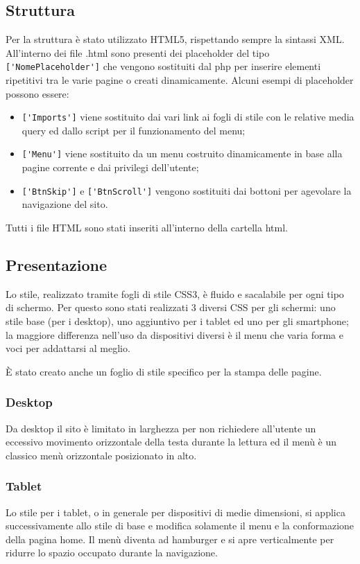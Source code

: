 \subsection{Struttura}
    Per la struttura è stato utilizzato HTML5, rispettando sempre la sintassi XML.
    All'interno dei file .html sono presenti dei placeholder del tipo \verb|['NomePlaceholder']| che vengono sostituiti dal php per inserire elementi ripetitivi tra le varie pagine o creati dinamicamente.
    Alcuni esempi di placeholder possono essere:
    \begin{itemize}
        \item \verb|['Imports']| viene sostituito dai vari link ai fogli di stile con le relative media query ed dallo script per il funzionamento del menu;
        \item \verb|['Menu']| viene sostituito da un menu costruito dinamicamente in base alla pagine corrente e dai privilegi dell'utente;
        \item \verb|['BtnSkip']| e \verb|['BtnScroll']| vengono sostituiti dai bottoni per agevolare la navigazione del sito.
    \end{itemize}
    Tutti i file HTML sono stati inseriti all'interno della cartella html.

\subsection{Presentazione}
Lo stile, realizzato tramite fogli di stile CSS3, è fluido e sacalabile per ogni tipo di schermo.
Per questo sono stati realizzati 3 diversi CSS per gli schermi: uno stile base (per i desktop), uno aggiuntivo per i tablet ed uno per gli smartphone;
la maggiore differenza nell'uso da dispositivi diversi è il menu che varia forma e voci per addattarsi al meglio.

È stato creato anche un foglio di stile specifico per la stampa delle pagine.

\subsubsection{Desktop}
Da desktop il sito è limitato in larghezza per non richiedere all'utente un eccessivo movimento orizzontale della testa durante la lettura ed il menù è un classico menù orizzontale posizionato in alto.

\subsubsection{Tablet}
Lo stile per i tablet, o in generale per dispositivi di medie dimensioni, si applica successivamente allo stile di base e modifica solamente il menu e la conformazione della pagina home.
Il menù diventa ad hamburger e si apre verticalmente per ridurre lo spazio occupato durante la navigazione.

